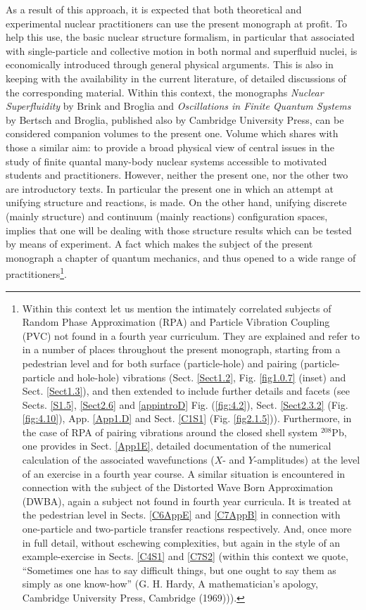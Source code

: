 As a result of this approach, it is expected that both theoretical and experimental nuclear practitioners can use the present monograph at profit. To help this use, the basic nuclear structure formalism, in particular that associated with single-particle and collective motion in both normal and superfluid nuclei, is economically introduced through general physical arguments. This is also in keeping with the availability in the current literature, of detailed discussions of the corresponding material. Within this context, the monographs \emph{Nuclear Superfluidity} by Brink and Broglia and \emph{Oscillations in Finite Quantum Systems}  by Bertsch and Broglia, published also by Cambridge University Press, can be considered companion volumes to the present one. Volume which shares with those a similar aim: to provide a broad physical view of central issues in the study of finite quantal many-body nuclear systems accessible to motivated students and practitioners. However, neither the present one, nor the other two are introductory texts. In particular the present one in which an attempt at unifying structure and reactions, is made. On the other hand, unifying discrete (mainly structure) and continuum  (mainly reactions) configuration spaces, implies that one will be dealing with those structure results which can be tested by means of experiment. A fact which makes the subject of the present monograph a chapter of quantum mechanics, and thus opened to a wide range of practitioners\footnote{Within this context let us mention the intimately correlated subjects of Random Phase Approximation (RPA) and Particle Vibration Coupling (PVC) not found in a fourth year curriculum. They are explained and refer to in a number of places throughout the present monograph, starting from a pedestrian level and for both surface (particle-hole) and pairing (particle-particle and hole-hole) vibrations (Sect. \ref{Sect1.2}, Fig. \ref{fig1.0.7} (inset)  and Sect. \ref{Sect1.3}), and then extended to include further details and facets (see Sects. \ref{S1.5}, \ref{Sect2.6} and \ref{appintroD} Fig. (\ref{fig:4.2}), Sect. \ref{Sect2.3.2} (Fig. \ref{fig:4.10}), App. \ref{App1.D} and  Sect. \ref{C1S1} (Fig. \ref{fig2.1.5})). Furthermore, in the case of RPA of pairing vibrations around the closed shell system $^{208}$Pb, one provides in Sect. \ref{App1E}, detailed documentation of the numerical calculation of the associated wavefunctions ($X$- and $Y$-amplitudes) at the level of an exercise in a fourth year course. A similar situation is encountered in connection with the subject of the Distorted Wave Born Approximation (DWBA), again a subject not found in fourth year curricula. It is treated at the pedestrian level in Sects. \ref{C6AppE} and \ref{C7AppB} in connection with one-particle and two-particle transfer reactions respectively. And,  once more in full detail, without eschewing complexities, but again in the style of an example-exercise  in Sects. \ref{C4S1} and \ref{C7S2} (within this context we quote, ``Sometimes one has to say difficult things, but one ought to say them as simply as one know-how'' (G. H. Hardy, A mathematician's apology, Cambridge University Press, Cambridge (1969))).}.

